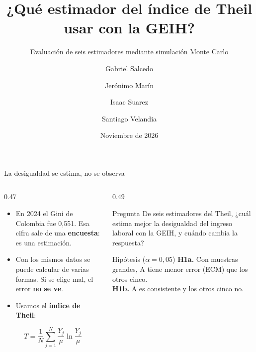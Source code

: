 \documentclass[aspectratio=169,11pt]{beamer}
\title{¿Qué estimador del índice de Theil usar con la GEIH?}
\subtitle{Evaluación de seis estimadores mediante simulación Monte Carlo}
\author{Gabriel Salcedo \and Jerónimo Marín \and Isaac Suarez \and Santiago Velandia}
\institute{Estadística --- Universidad del Rosario}
\date{Noviembre de 2026}
\begin{document}
\begin{frame}
  \titlepage
\end{frame}

\begin{frame}{La desigualdad se estima, no se observa}
  \begin{columns}[T]
    \begin{column}{0.47\textwidth}
      \begin{itemize}
        \item En 2024 el Gini de Colombia fue 0,551. Esa cifra sale de una \textbf{encuesta}: es una estimación.
        \item Con los mismos datos se puede calcular de varias formas. Si se elige mal, el error \textbf{no se ve}.
        \item Usamos el \textbf{índice de Theil}:
      \end{itemize}
      \[ T=\frac{1}{N}\sum_{j=1}^{N}\frac{Y_j}{\mu}\ln\frac{Y_j}{\mu} \]
    \end{column}
    \begin{column}{0.49\textwidth}
      \begin{block}{Pregunta}
        De seis estimadores del Theil, ¿cuál estima mejor la desigualdad del ingreso laboral con la GEIH, y cuándo cambia la respuesta?
      \end{block}
      \vspace{0.2cm}
      \begin{block}{Hipótesis ($\alpha=0{,}05$)}
        \textbf{H1a.} Con muestras grandes, A tiene menor error (ECM) que los otros cinco.\\[0.15cm]
        \textbf{H1b.} A es consistente y los otros cinco no.
      \end{block}
    \end{column}
  \end{columns}
\end{frame}
\end{document}
